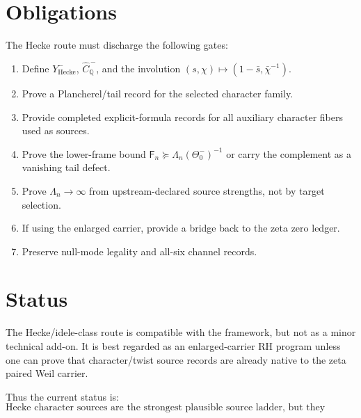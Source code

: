 \documentclass[11pt]{article}
\newcommand{\F}{\mathsf F}
\newcommand{\Hecke}{\mathrm{Hecke}}
\begin{document}
\section{Obligations}
The Hecke route must discharge the following gates:
\begin{enumerate}[label=H\arabic*.]
\item Define \(Y^-_{\Hecke}\), \(\widehat C_{\mathbb Q}^{\,-}\), and the involution \((s,\chi)\mapsto(1-\bar s,\bar\chi^{-1})\).
\item Prove a Plancherel/tail record for the selected character family.
\item Provide completed explicit-formula records for all auxiliary character fibers used as sources.
\item Prove the lower-frame bound \(\F_n\succeq\Lambda_n(\Theta_0^-)^{-1}\) or carry the complement as a vanishing tail defect.
\item Prove \(\Lambda_n\to\infty\) from upstream-declared source strengths, not by target selection.
\item If using the enlarged carrier, provide a bridge back to the zeta zero ledger.
\item Preserve null-mode legality and all-six channel records.
\end{enumerate}

\section{Status}
The Hecke/idele-class route is compatible with the framework, but not as a minor technical add-on.  It is best regarded as an enlarged-carrier RH program unless one can prove that character/twist source records are already native to the zeta paired Weil carrier.

Thus the current status is:
\begin{equation}
  \boxed{\text{Hecke character sources are the strongest plausible source ladder, but they require a completed enlarged-carrier record.}}
\end{equation}
\end{document}
